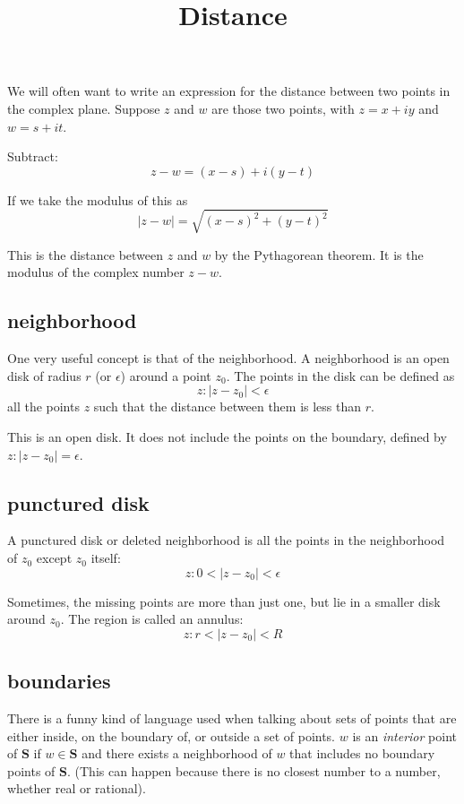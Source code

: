 \documentclass[11pt, oneside]{article}
\title{Distance}
\date{}
\begin{document}
\maketitle
\Large


We will often want to write an expression for the distance between two points in the complex plane.  Suppose $z$ and $w$ are those two points, with $z = x + iy$ and $w = s + it$.

Subtract:
\[ z - w = (x - s) + i (y - t) \]

If we take the modulus of this as
\[ |z - w| = \sqrt{(x - s)^2 + (y - t)^2} \]

This is the distance between $z$ and $w$ by the Pythagorean theorem.  It is the modulus of the complex number $z - w$.

\subsection*{neighborhood}

One very useful  concept is that of the neighborhood.  A neighborhood is an open disk of radius $r$ (or $\epsilon$) around a point $z_0$.  The points in the disk can be defined as 
\[ z:  |z - z_0| < \epsilon \]
all the points $z$ such that the distance between them is less than $r$.

This is an open disk.  It does not include the points on the boundary, defined by $z:  |z - z_0| = \epsilon$.

\subsection*{punctured disk}
A punctured disk or deleted neighborhood is all the points in the neighborhood of $z_0$ except $z_0$ itself:
\[ z:   0 < |z - z_0| < \epsilon \]

Sometimes, the missing points are more than just one, but lie in a smaller disk around $z_0$.  The region is called an annulus:
\[ z:   r < |z - z_0| < R \]

\subsection*{boundaries}

There is a funny kind of language used when talking about sets of points that are either inside, on the boundary of, or outside a set of points.  $w$ is an \emph{interior} point of $\mathbf{S}$ if $w \in \mathbf{S}$ and there exists a neighborhood of $w$ that includes no boundary points of $\mathbf{S}$.  (This can happen because there is no closest number to a number, whether real or rational).
\end{document}
